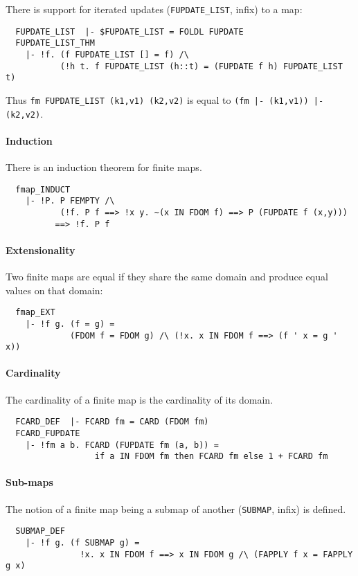 \noindent There is support for iterated updates ({\small\verb+FUPDATE_LIST+},
infix) to a map:
%
{\small
\begin{verbatim}
  FUPDATE_LIST  |- $FUPDATE_LIST = FOLDL FUPDATE
  FUPDATE_LIST_THM
    |- !f. (f FUPDATE_LIST [] = f) /\
           (!h t. f FUPDATE_LIST (h::t) = (FUPDATE f h) FUPDATE_LIST t)
\end{verbatim}}
%
\noindent Thus {\small\verb+fm FUPDATE_LIST (k1,v1) (k2,v2)+} is equal
to {\small\verb+(fm |- (k1,v1)) |- (k2,v2)+}.

\paragraph {Induction}

There is an induction theorem for finite maps.
%
{\small
\begin{verbatim}
  fmap_INDUCT
    |- !P. P FEMPTY /\
           (!f. P f ==> !x y. ~(x IN FDOM f) ==> P (FUPDATE f (x,y)))
          ==> !f. P f
\end{verbatim}
}

\paragraph{Extensionality}
Two finite maps are equal if they share the same domain and produce
equal values on that domain:
{\small
\begin{verbatim}
  fmap_EXT
    |- !f g. (f = g) =
             (FDOM f = FDOM g) /\ (!x. x IN FDOM f ==> (f ' x = g ' x))
\end{verbatim}}

\paragraph{Cardinality}

The cardinality of a finite map is the cardinality of its domain.
%
{\small
\begin{verbatim}
  FCARD_DEF  |- FCARD fm = CARD (FDOM fm)
  FCARD_FUPDATE
    |- !fm a b. FCARD (FUPDATE fm (a, b)) =
                  if a IN FDOM fm then FCARD fm else 1 + FCARD fm
\end{verbatim}}

\paragraph {Sub-maps}

The notion of a finite map being a submap of another
({\small\verb+SUBMAP+}, infix) is defined.
{\small
\begin{verbatim}
  SUBMAP_DEF
    |- !f g. (f SUBMAP g) =
               !x. x IN FDOM f ==> x IN FDOM g /\ (FAPPLY f x = FAPPLY g x)
\end{verbatim}}

